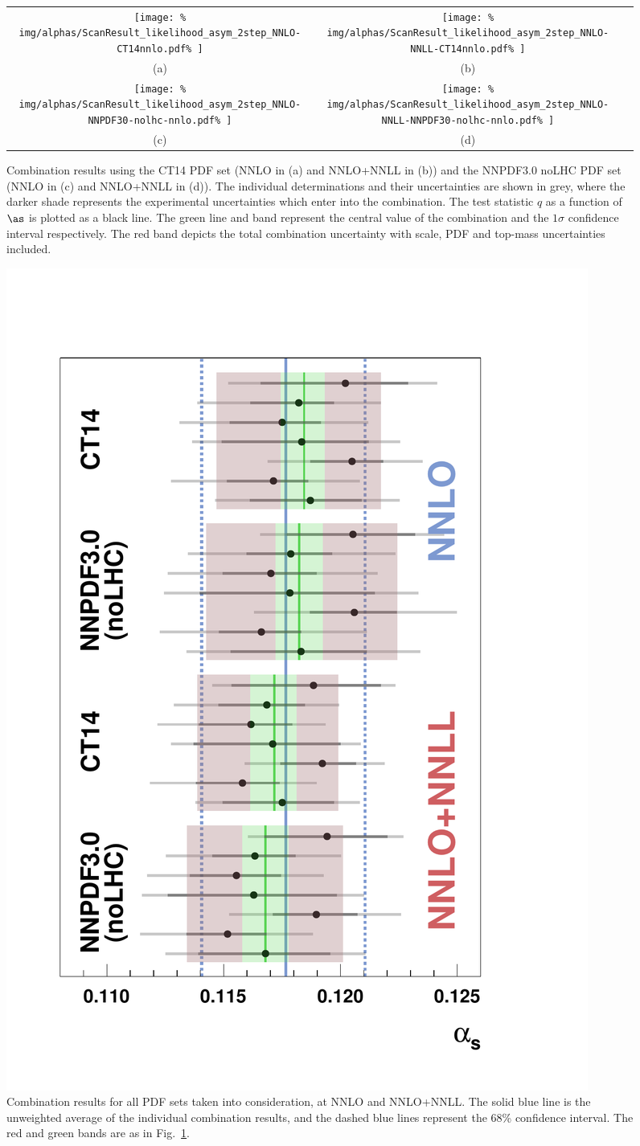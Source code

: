 \newcommand{\ScanFigureWidth}{0.47}  
\begin{figure}[htb]
\centering
\begin{tabular}{ccc}
\texttt{[image: \%
    img/alphas/ScanResult\_likelihood\_asym\_2step\_NNLO-CT14nnlo.pdf\%
    ]}
&
\texttt{[image: \%
    img/alphas/ScanResult\_likelihood\_asym\_2step\_NNLO-NNLL-CT14nnlo.pdf\%
    ]}
\\[-6pt]
(a) & (b) \\[8pt]
%
\texttt{[image: \%
    img/alphas/ScanResult\_likelihood\_asym\_2step\_NNLO-NNPDF30-nolhc-nnlo.pdf\%
    ]}
&
\texttt{[image: \%
    img/alphas/ScanResult\_likelihood\_asym\_2step\_NNLO-NNLL-NNPDF30-nolhc-nnlo.pdf\%
    ]}
\\[-6pt]
(c) & (d) \\[6pt]
\end{tabular}
\vspace{-0.3cm}
\caption{
Combination results using the CT14 PDF set (NNLO in (a) and NNLO+NNLL in (b)) and the NNPDF3.0 noLHC PDF set (NNLO in (c) and NNLO+NNLL in (d)).
%
The individual determinations and their uncertainties are shown in grey, where the darker shade represents the experimental uncertainties which enter into the combination.
The test statistic $q$ as a function of $\as$ is plotted as a black line.
The green line and band represent the central value of the combination and the $1\sigma$ confidence interval respectively. 
The red band depicts the total combination uncertainty with scale, PDF
and top-mass uncertainties included.
}
\label{fig:ScanResults}
\end{figure}
% 
%
\begin{figure}[htb]
\centering
\includegraphics[width=0.6\linewidth]{img/alphas/summaryPlot_Collection_bfins_Jul05.pdf}
\vspace{-0.3cm}
\caption{
Combination results for all PDF sets taken into consideration, at NNLO
and NNLO+NNLL. The solid blue line is the unweighted average of the
individual combination results, and the dashed blue lines represent
the 68\% confidence interval.
%
The red and green bands are as in Fig.~\ref{fig:ScanResults}.
%
}
\label{fig:unweightedaverage}
\end{figure}

